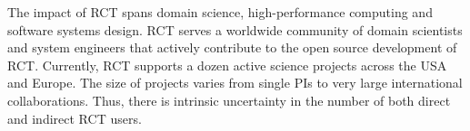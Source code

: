 \documentclass[preprint,12pt, a4paper]{elsarticle}
\begin{document}



The impact of RCT spans domain science, high-performance computing and software
systems design. RCT serves a worldwide community of domain scientists and system
engineers that actively contribute to the open source development of RCT\@.
Currently, RCT supports a dozen active science projects across the USA and
Europe. The size of projects varies from single PIs to very large international
collaborations. Thus, there is intrinsic uncertainty in the number of both
direct and indirect RCT users.
\end{document}
